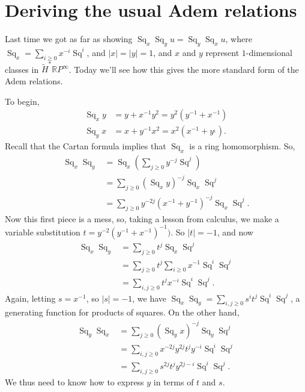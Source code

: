 \documentclass{article}
\newcommand{\R}{\mathbb{R}}
\newcommand{\RP}{\R P}
\DeclareMathOperator{\Sq}{Sq}
\begin{document}

\section{Deriving the usual Adem relations} %

Last time we got as far as showing $\Sq_x \Sq_y u = \Sq_y \Sq_x u$, where $\Sq_x = \sum_{i \ge 0} x^{-i} \Sq^i$, and $|x| = |y| = 1$, and $x$ and $y$ represent $1$-dimensional classes in $\tilde H^* \RP^\infty$.  Today we'll see how this gives the more standard form of the Adem relations.

To begin,
\begin{align*}
\Sq_x y & = y + x^{-1} y^2 = y^2(y^{-1} + x^{-1}) \\
\Sq_y x & = x + y^{-1} x^2 = x^2(x^{-1} + y^{_1}).
\end{align*}
Recall that the Cartan formula implies that $\Sq_x$ is a ring homomorphism.  So,
\begin{align*}
\Sq_x \Sq_y & = \Sq_x \left( \sum_{j \ge 0} y^{-j} \Sq^j \right) \\
& = \sum_{j \ge 0}(\Sq_x y)^{-j} \Sq_x \Sq^j \\
& = \sum_{j \ge 0} y^{-2j}(x^{-1} + y^{-1})^{-j} \Sq_x \Sq^j.
\end{align*}
Now this first piece is a mess, so, taking a lesson from calculus, we make a variable substitution $t = y^{-2}(y^{-1} + x^{-1})^{-1})$.  So $|t| = -1$, and now
\begin{align*}
\Sq_x \Sq_y & = \sum_{j \ge 0} t^j \Sq_x \Sq^j \\
& = \sum_{j \ge 0} t^j \sum_{i \ge 0} x^{-1} \Sq^i \Sq^j \\
& = \sum_{i, j \ge 0} t^j x^{-i} \Sq^i \Sq^j.
\end{align*}
Again, letting $s = x^{-1}$, so $|s| = -1$, we have $\Sq_x \Sq_y = \sum_{i, j \ge 0} s^i t^j \Sq^i \Sq^j$, a generating function for products of squares.  On the other hand,
\begin{align*}
\Sq_y \Sq_x & = \sum_{j \ge 0}(\Sq_y x)^{-j} \Sq_y \Sq^j \\
& = \sum_{i, j \ge 0} x^{-2j} y^{2j} t^j y^{-i} \Sq^i \Sq^j \\
& = \sum_{i, j \ge 0} s^{2j} t^j y^{2j-i} \Sq^i \Sq^j.
\end{align*}
We thus need to know how to express $y$ in terms of $t$ and $s$.
\end{document}
